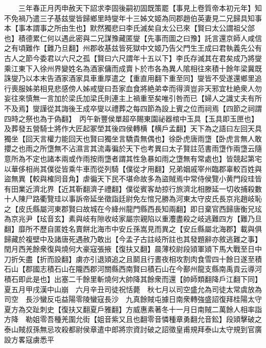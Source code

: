 　　三年春正月丙申赦天下詔求李固後嗣初固既策罷【事見上卷質帝本初元年】知不免禍乃遣三子基兹燮皆歸鄉里時燮年十三姊文姬為同郡趙伯英妻見二兄歸具知事本【事本謂事之所由生也】默然獨悲曰李氏滅矣自太公已來【賢曰太公謂祖父郃也】積德累仁何以遇此密與二兄謀豫藏匿燮【先事而圖之曰豫】託言還京師人咸信之有頃難作【難乃旦翻】州郡收基兹皆死獄中文姬乃告父門生王成曰君執義先公有古人之節今委君以六尺之孤【賢曰六尺謂年十五以下】李氏存滅其在君矣成乃將燮乘江東下入徐州界變姓名為酒家傭而成賣卜於市各為異人隂相往來積十餘年梁冀既誅燮乃以本末告酒家酒家具車重厚遣之【重直用翻下重至同】燮皆不受遂還鄉里追行喪服姊弟相見悲感傍人姊戒燮曰吾家血食將絶弟幸而得濟豈非天邪宜杜絶衆人勿妄往來慎無一言加於梁氏加梁氏則連主上禍重至矣唯引咎而已【婦人之識丈夫有所不及焉】燮謹從其誨後王成卒燮以禮葬之每四節為設上賓之位而祠焉【四節之祠謂四時之祭也為于偽翻】　丙午新豐侯單超卒賜東園祕器棺中玉具【玉具即玉匣也】及葬發五營騎士將作大匠起冢塋其後四侯轉横【横戶孟翻】天下為之語曰左回天具獨坐【回天言權力能回天也賢曰獨坐言驕貴無偶也】徐卧虎唐雨墯【卧虎言無人敢攖之也雨之所墯無不沾濕言其流毒徧於天下也考異曰太子賢註范書雨墯作兩墯云隨意所為不定也諸本兩或作雨按雨墯者謂其性急暴如雨之墯無有常處也】皆競起第宅以華侈相尚其僕從皆乘牛車而從列騎【僕從才用翻】兄弟姻戚宰州臨郡辜較百姓與盜無異【較與榷同音角】虐徧天下民不堪命故多為盜賊焉中常侍侯覽小黄門段珪皆有田業近濟北界【近其靳翻濟子禮翻】僕從賓客劫掠行旅濟北相滕延一切收捕殺數十人陳尸路衢覽珪以事訴帝延坐徵詣廷尉免左悺兄勝為河東太守皮氏長京兆趙岐恥之【皮氏縣屬河東郡賢曰故城在今絳州龍門縣西長知兩翻】即日棄官西歸唐衡兄玹為京兆尹【玹音玄】素與岐有隙收岐家屬宗親陷以重灋盡殺之岐逃難四方【難乃旦翻】靡所不歷自匿姓名賣餅北海市中安丘孫嵩見而異之【安丘縣屬北海郡】載與俱歸藏於複壁中及諸唐死遇赦乃敢出【今孟子古註岐所註也其發題辭亦敘逃難之事】　閏月西羌餘衆復與燒何大豪寇張掖【復扶又翻】晨薄校尉段熲軍熲下馬大戰至日中刀折矢盡【折而設翻】虜亦引退熲追之且鬬且行晝夜相攻割肉食雪四十餘日遂至積石山【郡國志積石山在隴西郡河關縣西南賢曰積石山在今鄯州龍支縣南禹貢云導河積石即此是也】出塞二千餘里斬燒何大帥降其餘衆而還【帥師類翻降戶江翻下同】　夏五月甲戌漢中山崩　六月辛丑司徒祝恬薨　秋七月以司空盛允為司徒太常虞放為司空　長沙蠻反屯益陽零陵蠻寇長沙　九真餘賊屯據日南衆轉強盛詔復拜桂陽太守夏方為交趾刺史【復扶又翻夏戶雅翻】方威惠素著冬十一月日南賊二萬餘人相率詣方降　勒姐零吾種羌圍允街【姐音紫又且也翻零音憐種章勇翻允音鈆】段熲擊破之　泰山賊叔孫無忌攻殺都尉侯章遣中郎將宗資討破之詔徵皇甫規拜泰山太守規到官廣設方畧寇虜悉平

